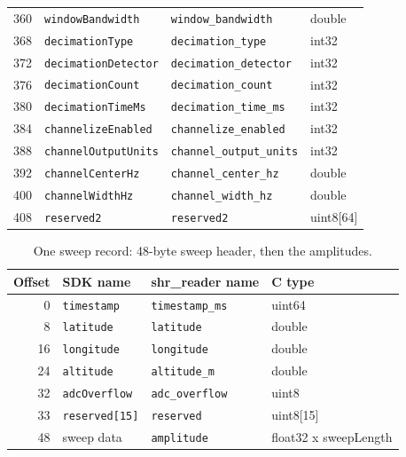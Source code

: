 \documentclass[11pt,a4paper]{article}
\begin{document}
\begin{longtable}{rp{3.4cm}p{4.2cm}l}
360 & \texttt{windowBandwidth} & \texttt{window\_\allowbreak{}bandwidth} & double\\
368 & \texttt{decimationType} & \texttt{decimation\_\allowbreak{}type} & int32\\
372 & \texttt{decimationDetector} & \texttt{decimation\_\allowbreak{}detector} & int32\\
376 & \texttt{decimationCount} & \texttt{decimation\_\allowbreak{}count} & int32\\
380 & \texttt{decimationTimeMs} & \texttt{decimation\_\allowbreak{}time\_\allowbreak{}ms} & int32\\
384 & \texttt{channelizeEnabled} & \texttt{channelize\_\allowbreak{}enabled} & int32\\
388 & \texttt{channelOutputUnits} & \texttt{channel\_\allowbreak{}output\_\allowbreak{}units} & int32\\
392 & \texttt{channelCenterHz} & \texttt{channel\_\allowbreak{}center\_\allowbreak{}hz} & double\\
400 & \texttt{channelWidthHz} & \texttt{channel\_\allowbreak{}width\_\allowbreak{}hz} & double\\
408 & \texttt{reserved2} & \texttt{reserved2} & uint8[64]\\
\bottomrule
\end{longtable}
\begin{longtable}{rp{3.4cm}p{4.2cm}l}
\caption{One sweep record: 48-byte sweep header, then the amplitudes.}\\
\toprule
\textbf{Offset} & \textbf{SDK name} & \textbf{shr\_reader name} & \textbf{C type}\\
\midrule
\endhead
0 & \texttt{timestamp} & \texttt{timestamp\_\allowbreak{}ms} & uint64\\
8 & \texttt{latitude} & \texttt{latitude} & double\\
16 & \texttt{longitude} & \texttt{longitude} & double\\
24 & \texttt{altitude} & \texttt{altitude\_\allowbreak{}m} & double\\
32 & \texttt{adcOverflow} & \texttt{adc\_\allowbreak{}overflow} & uint8\\
33 & \texttt{reserved[15]} & \texttt{reserved} & uint8[15]\\
48 & sweep data & \texttt{amplitude} & float32 x sweepLength\\
\bottomrule
\end{longtable}
\end{document}
